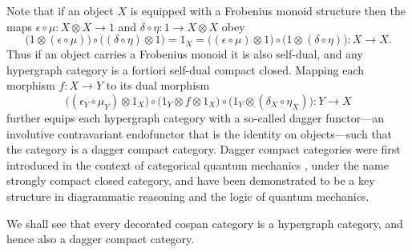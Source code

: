 Note that if an object $X$ is equipped with a Frobenius monoid structure then
the maps $\epsilon \circ \mu\colon  X \otimes X \longrightarrow 1$ and $\delta \circ
\eta\colon  1 \longrightarrow X \otimes X$ obey 
\[
  \big(1 \otimes (\epsilon \circ \mu)\big) \circ \big((\delta \circ \eta)
  \otimes 1\big) = 1_X = \big((\epsilon \circ \mu) \otimes 1\big) \circ \big(1
  \otimes (\delta \circ \eta)\big)\colon X \longrightarrow X.
\]
Thus if an object carries a Frobenius monoid it is also self-dual, and any
hypergraph category is a fortiori self-dual compact closed. Mapping each
morphism $f\colon  X \to Y$ to its dual morphism
\[
  \big((\epsilon_Y \circ \mu_Y) \otimes 1_X\big) \circ \big( 1_Y \otimes f
  \otimes 1_X \big) \circ \big(1_Y \otimes (\delta_X \circ \eta_X)\big)\colon  Y
  \longrightarrow X
\]
further equips each hypergraph category with a so-called dagger functor---an
involutive contravariant endofunctor that is the identity on objects---such that
the category is a dagger compact category. Dagger compact categories were first
introduced in the context of categorical quantum mechanics \cite{AC}, under the
name strongly compact closed category, and have been demonstrated to be a key
structure in diagrammatic reasoning and the logic of quantum mechanics.

We shall see that every decorated cospan category is a hypergraph category, and
hence also a dagger compact category.

